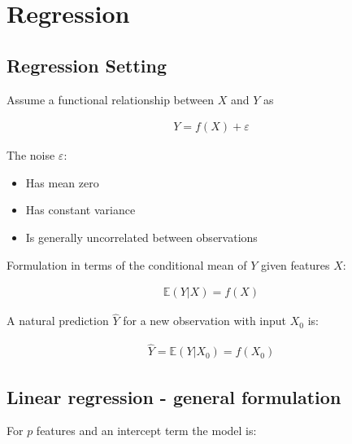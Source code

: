 \documentclass{article}
\begin{document}
\pagebreak

\section{Regression}

\subsection{Regression Setting}

Assume a functional relationship between $X$ and $Y$ as

\begin{align*}
    Y=f(X)+\varepsilon
\end{align*}

The noise $\varepsilon$:
\begin{itemize}
    \item Has mean zero
    \item Has constant variance
    \item Is generally uncorrelated between observations
\end{itemize}

Formulation in terms of the conditional mean of $Y$ given features $X$:

\begin{align*}
    \mathbb{E}(Y|X)=f(X)
\end{align*}

A natural prediction $\hat{Y}$ for a new observation with input $X_0$ is:

\begin{align*}
    \hat{Y}=\mathbb{E}(Y|X_0)=f(X_0)
\end{align*}

\subsection{Linear regression - general formulation}

For $p$ features and an intercept term the model is:
\end{document}
